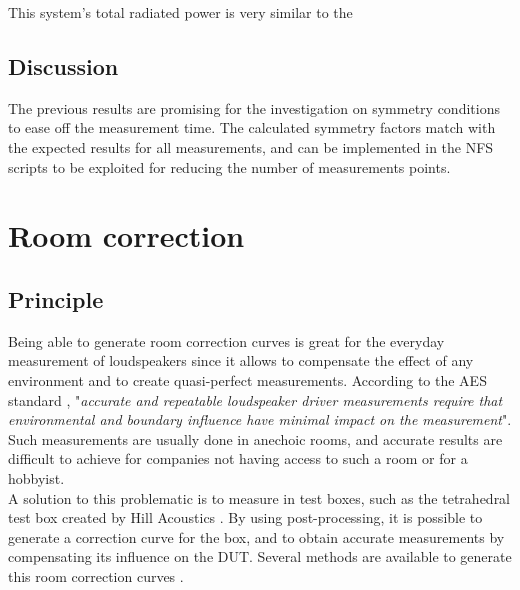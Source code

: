 \documentclass{report}
\begin{document}
This system's total radiated power is very similar to the 

\section{Discussion}

The previous results are promising for the investigation on symmetry conditions to ease off the measurement time. The calculated symmetry factors match with the expected results for all measurements, and can be implemented in the NFS scripts to be exploited for reducing the number of measurements points. 


\chapter{Room correction}

\section{Principle}

Being able to generate room correction curves is great for the everyday measurement of loudspeakers since it allows to compensate the effect of any environment and to create quasi-perfect measurements. According to the AES standard \cite{aesstandart}, "\textit{accurate and repeatable loudspeaker driver measurements require that environmental and boundary influence have minimal impact on the measurement}". Such measurements are usually done in anechoic rooms, and accurate results are difficult to achieve for companies not having access to such a room or for a hobbyist. \\

A solution to this problematic is to measure in test boxes, such as the tetrahedral test box created by Hill Acoustics \citep[see][]{tetbox}. By using post-processing, it is possible to generate a correction curve for the box, and to obtain accurate measurements by compensating its influence on the DUT. Several methods are available to generate this room correction curves \citep[see][]{aeswb}.\\
\end{document}
